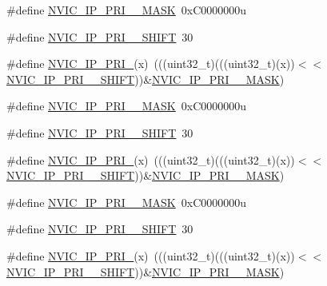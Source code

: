 \begin{DoxyCompactItemize}
\item 
\#define \hyperlink{group___n_v_i_c___register___masks_gae8ec204dbf1e1b4cb8231ae35dd8c9e9}{N\+V\+I\+C\+\_\+\+I\+P\+\_\+\+P\+R\+I\+\_\+\_\+\+M\+A\+SK}~0x\+C0000000u
\item 
\#define \hyperlink{group___n_v_i_c___register___masks_gac90bf47a30adde534ef2a3ab6b79f77f}{N\+V\+I\+C\+\_\+\+I\+P\+\_\+\+P\+R\+I\+\_\+\_\+\+S\+H\+I\+FT}~30
\item 
\#define \hyperlink{group___n_v_i_c___register___masks_ga5d8180d6ef5d39d0726b35141c024671}{N\+V\+I\+C\+\_\+\+I\+P\+\_\+\+P\+R\+I\+\_}(x)~(((uint32\+\_\+t)(((uint32\+\_\+t)(x))$<$$<$\hyperlink{group___n_v_i_c___register___masks_gac90bf47a30adde534ef2a3ab6b79f77f}{N\+V\+I\+C\+\_\+\+I\+P\+\_\+\+P\+R\+I\+\_\+\_\+\+S\+H\+I\+FT}))\&\hyperlink{group___n_v_i_c___register___masks_gae8ec204dbf1e1b4cb8231ae35dd8c9e9}{N\+V\+I\+C\+\_\+\+I\+P\+\_\+\+P\+R\+I\+\_\+\_\+\+M\+A\+SK})
\item 
\#define \hyperlink{group___n_v_i_c___register___masks_gaa6eb455f6bfa8fcb95723cf8086c14f3}{N\+V\+I\+C\+\_\+\+I\+P\+\_\+\+P\+R\+I\+\_\+\_\+\+M\+A\+SK}~0x\+C0000000u
\item 
\#define \hyperlink{group___n_v_i_c___register___masks_ga5bc982719d99986693dcc1bc4d72446e}{N\+V\+I\+C\+\_\+\+I\+P\+\_\+\+P\+R\+I\+\_\+\_\+\+S\+H\+I\+FT}~30
\item 
\#define \hyperlink{group___n_v_i_c___register___masks_ga89f959b5cf4359b783ec924f1546486b}{N\+V\+I\+C\+\_\+\+I\+P\+\_\+\+P\+R\+I\+\_}(x)~(((uint32\+\_\+t)(((uint32\+\_\+t)(x))$<$$<$\hyperlink{group___n_v_i_c___register___masks_ga5bc982719d99986693dcc1bc4d72446e}{N\+V\+I\+C\+\_\+\+I\+P\+\_\+\+P\+R\+I\+\_\+\_\+\+S\+H\+I\+FT}))\&\hyperlink{group___n_v_i_c___register___masks_gaa6eb455f6bfa8fcb95723cf8086c14f3}{N\+V\+I\+C\+\_\+\+I\+P\+\_\+\+P\+R\+I\+\_\+\_\+\+M\+A\+SK})
\item 
\#define \hyperlink{group___n_v_i_c___register___masks_ga7d7c0405750d75219f0fe0e3c5f48a26}{N\+V\+I\+C\+\_\+\+I\+P\+\_\+\+P\+R\+I\+\_\+\_\+\+M\+A\+SK}~0x\+C0000000u
\item 
\#define \hyperlink{group___n_v_i_c___register___masks_ga776c73ffc75170acf87f8bb3cf86ba6a}{N\+V\+I\+C\+\_\+\+I\+P\+\_\+\+P\+R\+I\+\_\+\_\+\+S\+H\+I\+FT}~30
\item 
\#define \hyperlink{group___n_v_i_c___register___masks_ga7bfc5eab0b9ee859499ec94e3e6f013c}{N\+V\+I\+C\+\_\+\+I\+P\+\_\+\+P\+R\+I\+\_}(x)~(((uint32\+\_\+t)(((uint32\+\_\+t)(x))$<$$<$\hyperlink{group___n_v_i_c___register___masks_ga776c73ffc75170acf87f8bb3cf86ba6a}{N\+V\+I\+C\+\_\+\+I\+P\+\_\+\+P\+R\+I\+\_\+\_\+\+S\+H\+I\+FT}))\&\hyperlink{group___n_v_i_c___register___masks_ga7d7c0405750d75219f0fe0e3c5f48a26}{N\+V\+I\+C\+\_\+\+I\+P\+\_\+\+P\+R\+I\+\_\+\_\+\+M\+A\+SK})
$$
\end{DoxyCompactItemize}
